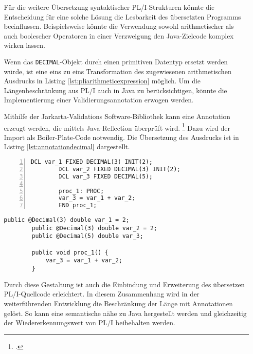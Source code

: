 Für die weitere Übersetzung syntaktischer PL/I-Strukturen könnte die Entscheidung für eine solche Lösung die Lesbarkeit des übersetzten Programms beeinflussen. Beispielsweise könnte die Verwendung sowohl arithmetischer als auch boolescher Operatoren in einer Verzweigung den Java-Zielcode komplex wirken lassen. 

Wenn das \verb+DECIMAL+-Objekt durch einen primitiven Datentyp ersetzt werden würde, ist eine eins zu eins Transformation des zugewiesenen arithmetischen Ausdrucks in Listing \ref{lst:pliarithmeticexpression} möglich. Um die Längenbeschränkung aus PL/I auch in Java zu berücksichtigen, könnte die Implementierung einer Validierungsannotation erwogen werden.

Mithilfe der Jarkarta-Validations Software-Bibliothek kann eine Annotation erzeugt werden, die mittels Java-Reflection überprüft wird. \footcite[Vgl. ][]{jakarta}
Dazu wird der Import als Boiler-Plate-Code  notwendig. 
Die Übersetzung des Ausdrucks ist in Listing \ref{lst:annotationdecimal} dargestellt.

\begin{minipage}[b]{0.48\linewidth}
	\centering
	\lstset{language=PL/I,label=SliceExaple}
	\begin{lstlisting}[frame=single, numbers=left, mathescape,%
		caption={Annotationslösung}, label={lst:annotationdecimal},
		basicstyle=\fontsize{9}{13}\selectfont\ttfamily]
		DCL var_1 FIXED DECIMAL(3) INIT(2);
		DCL var_2 FIXED DECIMAL(3) INIT(2);
		DCL var_3 FIXED DECIMAL(5);
		
		proc_1: PROC;
		var_3 = var_1 + var_2;
		END proc_1;
	\end{lstlisting}
\end{minipage}
\hspace{0.5cm}
\begin{minipage}[b]{0.48\linewidth}
	\centering
	\lstset{language=Java,label=SliceExaple}
	\begin{lstlisting}[frame=single, mathescape,%
		title={" "},
		basicstyle=\fontsize{9}{13}\selectfont\ttfamily]
		public @Decimal(3) double var_1 = 2;
		public @Decimal(3) double var_2 = 2;
		public @Decimal(5) double var_3;
		
		public void proc_1() {
			var_3 = var_1 + var_2;
		}
	\end{lstlisting}
\end{minipage}

Durch diese Gestaltung ist auch die Einbindung und Erweiterung des übersetzen PL/I-Quellcode erleichtert. In diesem Zusammenhang wird in der weiterführenden Entwicklung die Beschränkung der Länge mit Annotationen gelöst. So kann eine semantische nähe zu Java hergestellt werden und gleichzeitig der Wiedererkennungswert von PL/I beibehalten werden.

